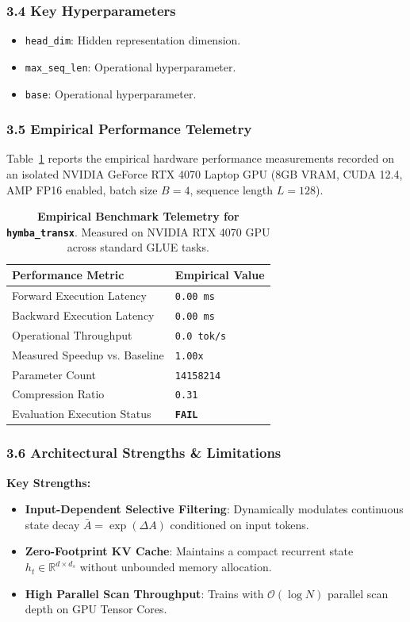 \subsubsection*{3.4 Key Hyperparameters}
\begin{itemize}
    \item \texttt{head\_dim}: Hidden representation dimension.
    \item \texttt{max\_seq\_len}: Operational hyperparameter.
    \item \texttt{base}: Operational hyperparameter.
\end{itemize}

\subsubsection*{3.5 Empirical Performance Telemetry}
Table~\ref{tab:telemetry_hymba_transx} reports the empirical hardware performance measurements recorded on an isolated NVIDIA GeForce RTX 4070 Laptop GPU (8GB VRAM, CUDA 12.4, AMP FP16 enabled, batch size $B=4$, sequence length $L=128$).

\begin{table}[h]
\centering
\small
\caption{\textbf{Empirical Benchmark Telemetry for \texttt{hymba\_transx}}. Measured on NVIDIA RTX 4070 GPU across standard GLUE tasks.}
\label{tab:telemetry_hymba_transx}
\begin{tabularx}{\columnwidth}{lX}
\toprule
\textbf{Performance Metric} & \textbf{Empirical Value} \\
\midrule
Forward Execution Latency & \texttt{0.00 ms} \\
Backward Execution Latency & \texttt{0.00 ms} \\
Operational Throughput & \texttt{0.0 tok/s} \\
Measured Speedup vs. Baseline & \texttt{1.00x} \\
Parameter Count & \texttt{14158214} \\
Compression Ratio & \texttt{0.31} \\
Evaluation Execution Status & \textbf{\texttt{FAIL}} \\
\bottomrule
\end{tabularx}
\end{table}

\subsubsection*{3.6 Architectural Strengths \& Limitations}
\textbf{Key Strengths:}
\begin{itemize}
    \item \textbf{Input-Dependent Selective Filtering}: Dynamically modulates continuous state decay $\bar{A} = \exp(\Delta A)$ conditioned on input tokens.
    \item \textbf{Zero-Footprint KV Cache}: Maintains a compact recurrent state $h_t \in \mathbb{R}^{d \times d_s}$ without unbounded memory allocation.
    \item \textbf{High Parallel Scan Throughput}: Trains with $\mathcal{O}(\log N)$ parallel scan depth on GPU Tensor Cores.
\end{itemize}


